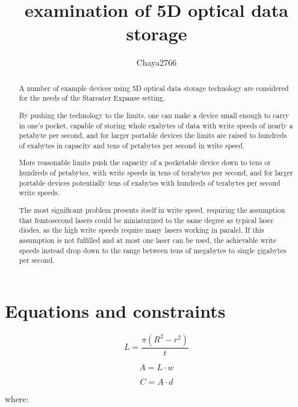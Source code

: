 \documentclass[a4paper]{article}
\title{examination of 5D optical data storage}
\author{Chaya2766}
\begin{document}
	\sffamily
	\sloppy
	
	\maketitle
	
	\vfill
	
	\begin{abstract}
		A number of example devices using 5D optical data storage technology are considered for the needs of the Stareater Expanse setting.
		
		\medskip
		
		By pushing the technology to the limits, one can make a device small enough to carry in one's pocket, capable of storing whole exabytes of data with write speeds of nearly a petabyte per second, and for larger portable devices the limits are raised to hundreds of exabytes in capacity and tens of petabytes per second in write speed.
		
		\medskip
		
		More reasonable limits push the capacity of a pocketable device down to tens or hundreds of petabytes, with write speeds in tens of terabytes per second, and for larger portable devices potentially tens of exabytes with hundreds of terabytes per second write speeds.
		
		\medskip
		
		The most significant problem presents itself in write speed, requiring the assumption that femtosecond lasers could be miniaturized to the same degree as typical laser diodes, as the high write speeds require many lasers working in paralel. If this assumption is not fulfilled and at most one laser can be used, the achievable write speeds instead drop down to the range between tens of megabytes to single gigabytes per second.
	\end{abstract}
	
	\vfill
	
	\tableofcontents
	
	\pagebreak
	
	\section{Equations and constraints}
	
	$$ L = \frac{\pi (R^2 - r^2)}{t} $$
	
	$$ A = L \cdot w $$
	
	$$ C = A \cdot d $$
	
	where:
	
\end{document}
